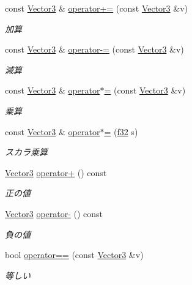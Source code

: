 \begin{DoxyCompactItemize}
\item 
const \hyperlink{struct_vector3}{Vector3} \& \hyperlink{struct_vector3_acc2624a2880ba96b96292d78b80b5f7c}{operator+=} (const \hyperlink{struct_vector3}{Vector3} \&v)
\begin{DoxyCompactList}\small\item\em 加算 \end{DoxyCompactList}\item 
const \hyperlink{struct_vector3}{Vector3} \& \hyperlink{struct_vector3_ab453410e5e2184e1a255495dada84609}{operator-\/=} (const \hyperlink{struct_vector3}{Vector3} \&v)
\begin{DoxyCompactList}\small\item\em 減算 \end{DoxyCompactList}\item 
const \hyperlink{struct_vector3}{Vector3} \& \hyperlink{struct_vector3_a71fab3eea2aac2738335149c27fa45db}{operator$\ast$=} (const \hyperlink{struct_vector3}{Vector3} \&v)
\begin{DoxyCompactList}\small\item\em 乗算 \end{DoxyCompactList}\item 
const \hyperlink{struct_vector3}{Vector3} \& \hyperlink{struct_vector3_a66d6b82ffd79c2212f04dd65fa85b1f1}{operator$\ast$=} (\hyperlink{_main_8h_a5f6906312a689f27d70e9d086649d3fd}{f32} s)
\begin{DoxyCompactList}\small\item\em スカラ乗算 \end{DoxyCompactList}\item 
\hyperlink{struct_vector3}{Vector3} \hyperlink{struct_vector3_a3ab63b97882ef750fc2bfe94477802b1}{operator+} () const 
\begin{DoxyCompactList}\small\item\em 正の値 \end{DoxyCompactList}\item 
\hyperlink{struct_vector3}{Vector3} \hyperlink{struct_vector3_a72a36c71164f1532d24ec49c3d7056fc}{operator-\/} () const 
\begin{DoxyCompactList}\small\item\em 負の値 \end{DoxyCompactList}\item 
bool \hyperlink{struct_vector3_a6ec99d2e2c0f781c257bf9c2e665ee40}{operator==} (const \hyperlink{struct_vector3}{Vector3} \&v)
\begin{DoxyCompactList}\small\item\em 等しい \end{DoxyCompactList}\item 

\end{DoxyCompactItemize}
